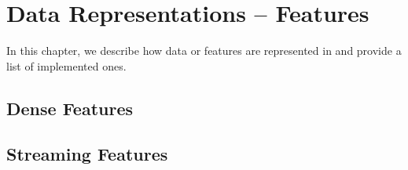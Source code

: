 %

\chapter{Data Representations -- Features}
\label{chp:shogun_objects-features}

In this chapter, we describe how data or features are represented in \shogun{} and provide a list of implemented ones.

\section{Dense Features}
\label{sec:shogun_objects-features-dense}


\section{Streaming Features}
\label{sec:shogun_objects-features-streaming}
